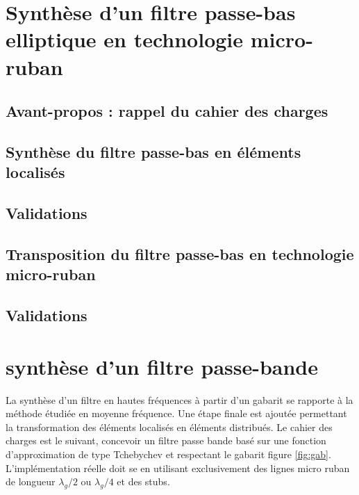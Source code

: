 \documentclass[french]{article}
\begin{document}
\newpage

\section{Synthèse d'un filtre passe-bas elliptique en technologie micro-ruban}

\subsection{Avant-propos : rappel du cahier des charges}

\subsection{Synthèse du filtre passe-bas en éléments localisés}

\subsection*{Validations}

\subsection{Transposition du filtre passe-bas en technologie micro-ruban}

\subsection*{Validations}

\newpage

\section{synthèse d'un filtre passe-bande}

La synthèse d'un filtre en hautes fréquences à partir d'un gabarit se rapporte à la méthode étudiée en moyenne fréquence. Une étape finale est ajoutée permettant la transformation des éléments localisés en éléments distribués.
Le cahier des charges est le suivant, concevoir un filtre passe bande basé sur une fonction d'approximation de type Tchebychev et respectant le gabarit figure \ref{fig:gab}. L'implémentation réelle doit se en utilisant exclusivement des lignes micro ruban de longueur $\lambda_g/2$ ou $\lambda_g/4$ et des stubs.
\end{document}
